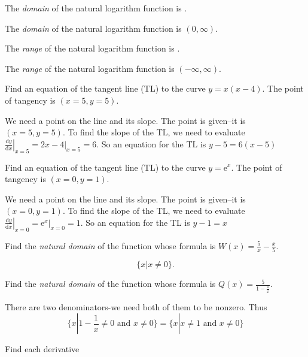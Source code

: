 \documentclass[12pt, fleqn]{exam}
\begin{document}
\begin{questions}
\question The \emph{domain} of the natural logarithm function is \underline{\phantom{xxxxxxxxx}}.
\begin{solution}
    The \emph{domain} of the natural logarithm function is  \((0,\infty)\).
\end{solution}
\question The \emph{range} of the natural logarithm function is    \underline{\phantom{xxxxxxxxx}}.
\begin{solution}
    The \emph{range} of the natural logarithm function is $(-\infty, \infty)$.
\end{solution}
\question Find an equation of the tangent line (TL) to the curve  $y = x (x-4)$. 
The point of tangency is $(x= 5, y=5)$.
\begin{solution}
    We need a point on the line and its slope.  The point is given--it is $(x= 5, y=5)$.
    To find the slope of the TL, we need to evaluate $\displaystyle
    \left. \frac{\mathrm{d}y}{\mathrm{d}x} \right \vert_{x=5} = 
    \left. 2x - 4\right \vert_{x=5}  = 6.$ So an equation for the TL is $y-5 = 6(x-5)$
    
\end{solution}
\question Find an equation of the tangent line (TL) to the curve $y = \mathrm{e}^x$. 
The point of tangency is $(x= 0, y=1)$.
\begin{solution}
    We need a point on the line and its slope.  The point is given--it is $(x= 0, y=1)$.
    To find the slope of the TL, we need to evaluate $\displaystyle
    \left. \frac{\mathrm{d}y}{\mathrm{d}x} \right \vert_{x=0} = 
    \left. \mathrm{e}^x \right \vert_{x=0}  = 1.$ So an equation for the 
    TL is $y-1 = x$
    
\end{solution}

\question Find the \emph{natural domain} of the function whose formula is $W(x) = \frac{5}{x} - \frac{x}{5}$.
\begin{solution}
    \[
     \{x | x \neq 0 \}.
    \]
    
\end{solution}

\question Find the \emph{natural domain} of the function whose formula is 
$Q(x) = \frac{5}{1 - \frac{1}{x}} $.
\begin{solution}
    There are two denominators-we need both of them to be nonzero. Thus
    \[
         \{x |   1 - \frac{1}{x} \neq 0 \mbox{ and } x \neq 0 \}
       =  \{x |   x \neq 1 \mbox{ and } x \neq 0 \}
    \]
\end{solution}
\question Find each derivative


\end{questions}
\end{document}
